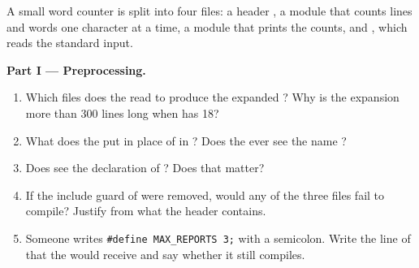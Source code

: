 \begin{problem}\label{pb:b1:compilation-pipeline:1}
A small word counter is split into four files: a header , a module  that counts
lines and words one character at a time, a module  that prints the counts, and ,
which reads the standard input.
\label{out:b1:compilation-pipeline:problem}

\medskip\noindent\textbf{Part I --- Preprocessing.}
\begin{enumerate}
\item Which files does the  read to produce the expanded ? Why is the expansion more
than 300 lines long when  has 18?
\item What does the  put in place of  in ? Does the  ever
see the name ?
\item Does  see the declaration of ? Does that matter?
\item If the include guard of  were removed, would any of the three files fail to compile? Justify
from what the header contains.
\item Someone writes \texttt{\#define MAX\_REPORTS 3;} with a semicolon. Write the line of  that the
 would receive and say whether it still compiles.
\end{enumerate}


\end{problem}
